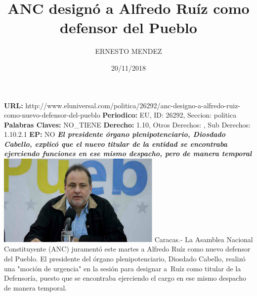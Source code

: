 \documentclass{article}%
\title{\textbf{ANC designó a Alfredo Ruíz como defensor del Pueblo}}%
\author{ERNESTO MENDEZ}%
\date{20/11/2018}%
\begin{document}
%
\normalsize%
\maketitle%
\textbf{URL: }%
http://www.eluniversal.com/politica/26292/anc{-}designo{-}a{-}alfredo{-}ruiz{-}como{-}nuevo{-}defensor{-}del{-}pueblo\newline%
%
\textbf{Periodico: }%
EU, %
ID: %
26292, %
Seccion: %
politica\newline%
%
\textbf{Palabras Claves: }%
NO\_TIENE\newline%
%
\textbf{Derecho: }%
1.10, %
Otros Derechos: %
, %
Sub Derechos: %
1.10.2.1\newline%
%
\textbf{EP: }%
NO\newline%
\newline%
%
\textbf{\textit{El presidente órgano plenipotenciario, Diosdado Cabello, explicó que el nuevo titular de la entidad se encontraba ejerciendo funciones en ese mismo despacho, pero de manera temporal}}%
\newline%
\newline%
%
\includegraphics[width=300px]{5.jpg}%
\newline%
%
Caracas.{-} La Asamblea Nacional Constituyente (ANC) juramentó este martes a Alfredo Ruíz como nuevo defensor del Pueblo.%
\newline%
%
El presidente del órgano plenipotenciario, Diosdado Cabello, realizó una "moción de urgencia" en la sesión para designar a~Ruíz como titular de la Defensoría, puesto que se encontraba ejerciendo el cargo en ese mismo despacho de manera temporal.%
\newline%
%
\end{document}
